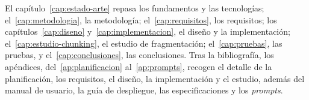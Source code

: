 El capítulo~\ref{cap:estado-arte} repasa los fundamentos y las tecnologías; el~\ref{cap:metodologia}, la metodología; el~\ref{cap:requisitos}, los requisitos; los capítulos~\ref{cap:diseno} y~\ref{cap:implementacion}, el diseño y la implementación; el~\ref{cap:estudio-chunking}, el estudio de fragmentación; el~\ref{cap:pruebas}, las pruebas, y el~\ref{cap:conclusiones}, las conclusiones. Tras la bibliografía, los apéndices, del~\ref{ap:planificacion} al~\ref{ap:prompts}, recogen el detalle de la planificación, los requisitos, el diseño, la implementación y el estudio, además del manual de usuario, la guía de despliegue, las especificaciones y los \emph{prompts}.
